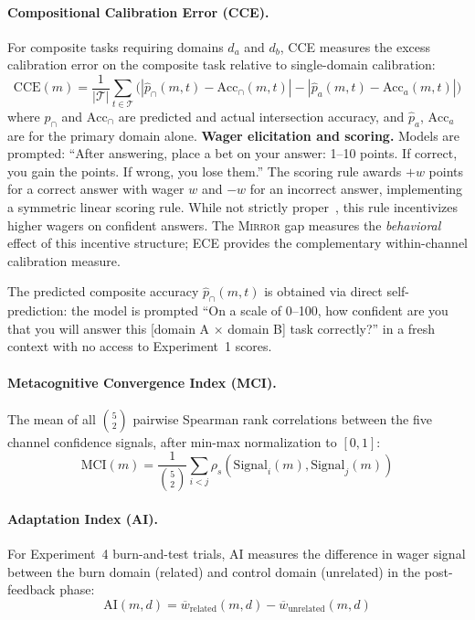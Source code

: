 \documentclass[10pt]{article}
\newcommand{\mirror}{\textsc{Mirror}}
\newcommand{\MCI}{MCI}
\newcommand{\CCE}{CCE}
\newcommand{\AI}{AI}
\begin{document}
\paragraph{Compositional Calibration Error (\CCE{}).}
For composite tasks requiring domains $d_a$ and $d_b$, CCE measures the excess calibration error on the composite task relative to single-domain calibration:
\begin{equation}
\text{CCE}(m) = \frac{1}{|\mathcal{T}|} \sum_{t \in \mathcal{T}} \bigl(|\hat{p}_{\cap}(m,t) - \text{Acc}_{\cap}(m,t)| - |\hat{p}_{a}(m,t) - \text{Acc}_{a}(m,t)|\bigr)
\label{eq:cce}
\end{equation}
where $\hat{p}_{\cap}$ and $\text{Acc}_{\cap}$ are predicted and actual intersection accuracy, and $\hat{p}_a$, $\text{Acc}_a$ are for the primary domain alone.
\textbf{Wager elicitation and scoring.} Models are prompted: ``After answering, place a bet on your answer: 1--10 points. If correct, you gain the points. If wrong, you lose them.'' The scoring rule awards $+w$ points for a correct answer with wager $w$ and $-w$ for an incorrect answer, implementing a symmetric linear scoring rule. While not strictly proper~\citep{gneiting2007strictly}, this rule incentivizes higher wagers on confident answers. The \mirror{} gap measures the \textit{behavioral} effect of this incentive structure; ECE provides the complementary within-channel calibration measure.

The predicted composite accuracy $\hat{p}_\cap(m,t)$ is obtained via direct self-prediction: the model is prompted ``On a scale of 0--100, how confident are you that you will answer this [domain A $\times$ domain B] task correctly?'' in a fresh context with no access to Experiment~1 scores.

\paragraph{Metacognitive Convergence Index (\MCI{}).}
The mean of all $\binom{5}{2}$ pairwise Spearman rank correlations between the five channel confidence signals, after min-max normalization to $[0,1]$:
\begin{equation}
\text{MCI}(m) = \frac{1}{\binom{5}{2}} \sum_{i < j} \rho_s(\text{Signal}_i(m), \text{Signal}_j(m))
\end{equation}

\paragraph{Adaptation Index (\AI{}).}
For Experiment~4 burn-and-test trials, AI measures the difference in wager signal between the burn domain (related) and control domain (unrelated) in the post-feedback phase:
\begin{equation}
\text{AI}(m, d) = \overline{w}_{\text{related}}(m, d) - \overline{w}_{\text{unrelated}}(m, d)
\end{equation}
\end{document}
